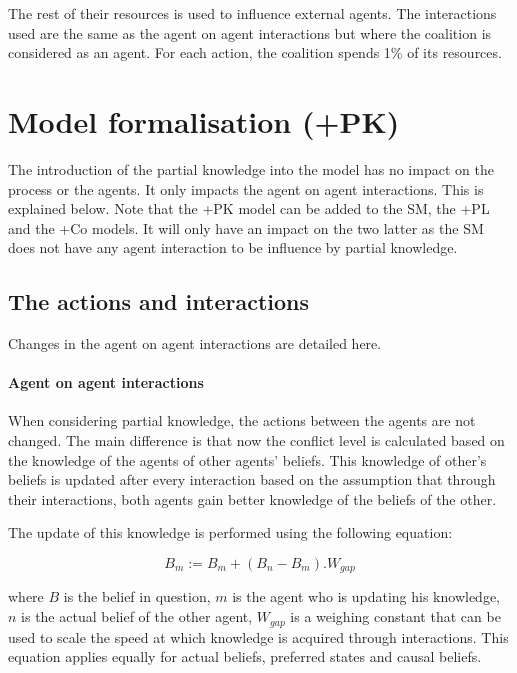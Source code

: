 \documentclass[11pt]{article}
\begin{document}
The rest of their resources is used to influence external agents. The interactions used are the same as the agent on agent interactions but where the coalition is considered as an agent. For each action, the coalition spends 1\% of its resources.



\section{Model formalisation (+PK)}

The introduction of the partial knowledge into the model has no impact on the process or the agents. It only impacts the agent on agent interactions. This is explained below. Note that the +PK model can be added to the SM, the +PL and the +Co models. It will only have an impact on the two latter as the SM does not have any agent interaction to be influence by partial knowledge.

\subsection{The actions and interactions}

Changes in the agent on agent interactions are detailed here.

\paragraph{Agent on agent interactions}

When considering partial knowledge, the actions between the agents are not changed. The main difference is that now the conflict level is calculated based on the knowledge of the agents of other agents' beliefs. This knowledge of other's beliefs is updated after every interaction based on the assumption that through their interactions, both agents gain better knowledge of the beliefs of the other.

The update of this knowledge is performed using the following equation:

\begin{equation}
B_{m} := B_{m} + (B_{n} - B_{m}). W_{gap}
\end{equation}

where $B$ is the belief in question, $m$ is the agent who is updating his knowledge, $n$ is the actual belief of the other agent, $W_{gap}$ is a weighing constant that can be used to scale the speed at which knowledge is acquired through interactions. This equation applies equally for actual beliefs, preferred states and causal beliefs.
\end{document}
